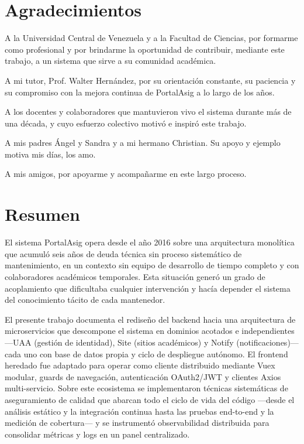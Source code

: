 \chapter*{Agradecimientos}
A la Universidad Central de Venezuela y a la Facultad de Ciencias, por formarme
como profesional y por brindarme la oportunidad de contribuir, mediante este
trabajo, a un sistema que sirve a su comunidad acad\'{e}mica.

A mi tutor, Prof. Walter Hern\'{a}ndez, por su orientaci\'{o}n constante, su paciencia y
su compromiso con la mejora continua de PortalAsig a lo largo de los a\~{n}os.

A los docentes y colaboradores que mantuvieron vivo el sistema durante m\'{a}s de una
d\'{e}cada, y cuyo esfuerzo colectivo motiv\'{o} e inspir\'{o} este trabajo.

A mis padres Ángel y Sandra y a mi hermano Christian. Su apoyo y ejemplo
motiva mis días, los amo.

A mis amigos, por apoyarme y acompañarme en este largo proceso.

\chapter*{Resumen}

El sistema PortalAsig opera desde el a\~{n}o 2016 sobre una arquitectura monol\'{i}tica
que acumul\'{o} seis a\~{n}os de deuda t\'{e}cnica sin proceso sistem\'{a}tico de
mantenimiento, en un contexto sin equipo de desarrollo de tiempo completo y con
colaboradores acad\'{e}micos temporales. Esta situaci\'{o}n gener\'{o} un grado de
acoplamiento que dificultaba cualquier intervenci\'{o}n y hac\'{i}a depender el sistema
del conocimiento t\'{a}cito de cada mantenedor.

El presente trabajo documenta el redise\~{n}o del backend hacia una arquitectura de
microservicios que descompone el sistema en dominios acotados e independientes
---UAA (gesti\'{o}n de identidad), Site (sitios acad\'{e}micos) y Notify (notificaciones)---
cada uno con base de datos propia y ciclo de despliegue aut\'{o}nomo. El frontend heredado fue adaptado para operar como
cliente distribuido mediante Vuex modular, guards de navegaci\'{o}n, autenticaci\'{o}n
OAuth2/JWT y clientes Axios multi-servicio. Sobre este ecosistema se implementaron
t\'{e}cnicas sistem\'{a}ticas de aseguramiento de calidad que abarcan todo el ciclo
de vida del c\'{o}digo ---desde el an\'{a}lisis est\'{a}tico y la integraci\'{o}n continua
hasta las pruebas end-to-end y la medici\'{o}n de cobertura--- y se instrument\'{o}
observabilidad distribuida para consolidar m\'{e}tricas y logs en un panel
centralizado.

